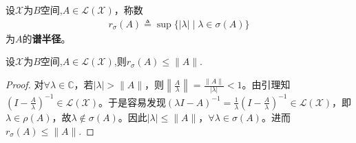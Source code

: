 \documentclass[../../main.tex]{subfiles}%
\begin{document}
\begin{definition}[谱半径]
设$\mathscr{X}$为$B$空间,$A\in\mathscr{L}(\mathscr{X})$，称数
\begin{align*}
r_{\sigma}(A)\triangleq\sup\{|\lambda|\mid\lambda\in\sigma(A)\}
\end{align*}
为$A$的\textbf{谱半径}。
\end{definition}

\begin{proposition}\label{proposition:算子范数都大于谱半径}
设$\mathscr{X}$为$B$空间,$A\in\mathscr{L}(\mathscr{X})$,则$r_{\sigma}(A)\leqslant\|A\|$.
\end{proposition}
\begin{proof}
对$\forall \lambda \in \mathbb{C}$，若$|\lambda|>\|A\|$，则$\left\| \frac{A}{\lambda} \right\| = \frac{\|A\|}{|\lambda|}<1$。由引理知$\left( I-\frac{A}{\lambda} \right)^{-1} \in \mathscr{L}(\mathscr{X})$。于是容易发现$(\lambda I - A)^{-1} = \frac{1}{\lambda}\left( I-\frac{A}{\lambda} \right)^{-1} \in \mathscr{L}(\mathscr{X})$，即$\lambda \in \rho(A)$，故$\lambda \notin \sigma(A)$。因此$|\lambda| \leqslant \|A\|$，$\forall \lambda \in \sigma(A)$。进而$r_{\sigma}(A) \leqslant \|A\|$.
\end{proof}
\end{document}
